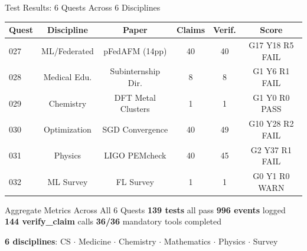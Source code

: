 \documentclass[aspectratio=169,11pt]{beamer}
\begin{document}
\begin{frame}{Test Results: 6 Quests Across 6 Disciplines}
  \begin{table}[h]
    \scriptsize
    \begin{tabular}{lccccc}
      \toprule
      Quest & Discipline & Paper & Claims & Verif. & Score \\
      \midrule
      027 & ML/Federated & pFedAFM (14pp) & 40 & 40 & G17 Y18 R5 FAIL \\
      028 & Medical Edu. & Subinternship Dir. & 8 & 8 & G1 Y6 R1 FAIL \\
      029 & Chemistry & DFT Metal Clusters & 1 & 1 & G1 Y0 R0 PASS \\
      030 & Optimization & SGD Convergence & 40 & 49 & G10 Y28 R2 FAIL \\
      031 & Physics & LIGO PEMcheck & 40 & 45 & G2 Y37 R1 FAIL \\
      032 & ML Survey & FL Survey & 1 & 1 & G0 Y1 R0 WARN \\
      \bottomrule
    \end{tabular}
  \end{table}

  \begin{block}{Aggregate Metrics Across All 6 Quests}
    \small
    \centering
    \textbf{139 tests} all pass \quad\textbar\quad
    \textbf{996 events} logged \quad\textbar\quad
    \textbf{144 verify\_claim} calls \quad\textbar\quad
    \textbf{36/36} mandatory tools completed

    \textbf{6 disciplines}: CS $\cdot$ Medicine $\cdot$ Chemistry $\cdot$ Mathematics $\cdot$ Physics $\cdot$ Survey
  \end{block}
\end{frame}
\end{document}
